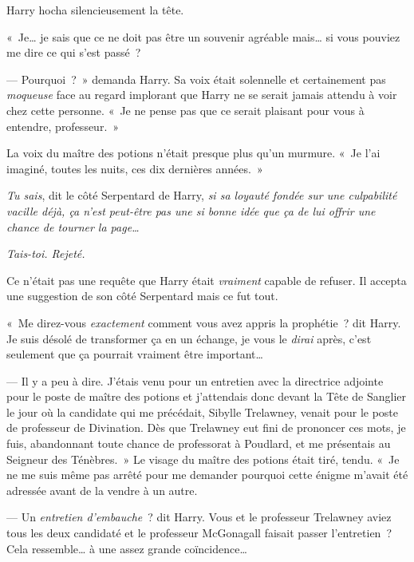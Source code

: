 Harry hocha silencieusement la tête.

«~Je… je sais que ce ne doit pas être un souvenir agréable mais… si vous pouviez me dire ce qui s'est passé~?

--- Pourquoi~?~»
demanda Harry.
Sa voix était solennelle et certainement pas \emph{moqueuse} face au regard implorant que Harry ne se serait jamais attendu à voir chez cette personne.
«~Je ne pense pas que ce serait plaisant pour vous à entendre, professeur.~»

La voix du maître des potions n'était presque plus qu'un murmure.
«~Je l'ai imaginé, toutes les nuits, ces dix dernières années.~»

\emph{Tu sais}, dit le côté Serpentard de Harry, \emph{si sa loyauté fondée sur une culpabilité vacille déjà, ça n'est peut-être pas une si bonne idée que ça de lui offrir une chance de tourner la page…}

\emph{Tais-toi.
Rejeté.}

Ce n'était pas une requête que Harry était \emph{vraiment} capable de refuser.
Il accepta une suggestion de son côté Serpentard mais ce fut tout.

«~Me direz-vous \emph{exactement} comment vous avez appris la prophétie~? dit Harry.
Je suis désolé de transformer ça en un échange, je vous le \emph{dirai} après, c'est seulement que ça pourrait vraiment être important…

--- Il y a peu à dire.
J'étais venu pour un entretien avec la directrice adjointe pour le poste de maître des potions et j'attendais donc devant la Tête de Sanglier le jour où la candidate qui me précédait, Sibylle Trelawney, venait pour le poste de professeur de Divination.
Dès que Trelawney eut fini de prononcer ces mots, je fuis, abandonnant toute chance de professorat à Poudlard, et me présentais au Seigneur des Ténèbres.~»
Le visage du maître des potions était tiré, tendu.
«~Je ne me suis même pas arrêté pour me demander pourquoi cette énigme m'avait été adressée avant de la vendre à un autre.

--- Un \emph{entretien d'embauche}~? dit Harry.
Vous et le professeur Trelawney aviez tous les deux candidaté et le professeur McGonagall faisait passer l'entretien~?
Cela ressemble… à une assez grande coïncidence…

